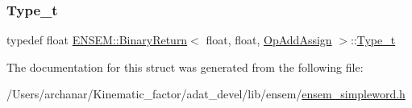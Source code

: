 \mbox{\label{structENSEM_1_1BinaryReturn_3_01float_00_01float_00_01OpAddAssign_01_4_af39f6f2b4b50fa85e57dfdabddfab31a}} 
\subsubsection{\texorpdfstring{Type\_t}{Type\_t}\hspace{0.1cm}{\footnotesize\ttfamily [2/2]}}
{\footnotesize\ttfamily typedef float \mbox{\hyperlink{structENSEM_1_1BinaryReturn}{E\+N\+S\+E\+M\+::\+Binary\+Return}}$<$ float, float, \mbox{\hyperlink{structENSEM_1_1OpAddAssign}{Op\+Add\+Assign}} $>$\+::\mbox{\hyperlink{structENSEM_1_1BinaryReturn_3_01float_00_01float_00_01OpAddAssign_01_4_af39f6f2b4b50fa85e57dfdabddfab31a}{Type\+\_\+t}}}



The documentation for this struct was generated from the following file\+:\begin{DoxyCompactItemize}
\item 
/\+Users/archanar/\+Kinematic\+\_\+factor/adat\+\_\+devel/lib/ensem/\mbox{\hyperlink{lib_2ensem_2ensem__simpleword_8h}{ensem\+\_\+simpleword.\+h}}\end{DoxyCompactItemize}

